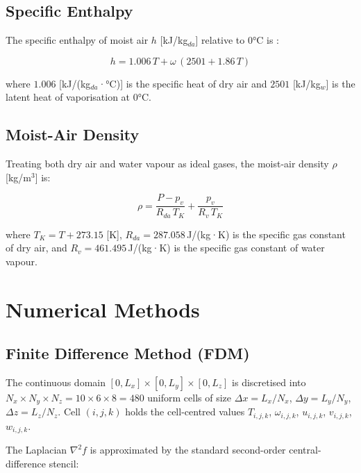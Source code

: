 \documentclass[12pt,a4paper]{report}
\begin{document}
\subsection{Specific Enthalpy}
\label{subsec:enthalpy}

The specific enthalpy of moist air $h$ [kJ/kg$_{da}$] relative to 0°C is \cite{ashrae2021}:

\begin{equation}
  \boxed{h = 1.006\,T + \omega\,(2501 + 1.86\,T)}
  \label{eq:enthalpy}
\end{equation}

where $1.006$ [kJ/(kg$_{da}$·°C)] is the specific heat of dry air and $2501$ [kJ/kg$_w$] is the latent heat of vaporisation at 0°C.

\subsection{Moist-Air Density}
\label{subsec:density}

Treating both dry air and water vapour as ideal gases, the moist-air density $\rho$ [kg/m$^3$] is:

\begin{equation}
  \boxed{\rho = \frac{P - p_v}{R_{da}\,T_K} + \frac{p_v}{R_v\,T_K}}
  \label{eq:density}
\end{equation}

where $T_K = T + 273.15$ [K], $R_{da} = 287.058$\,J/(kg·K) is the specific gas constant of dry air, and $R_v = 461.495$\,J/(kg·K) is the specific gas constant of water vapour.

\section{Numerical Methods}
\label{sec:numerics}

\subsection{Finite Difference Method (FDM)}
\label{subsec:fdm}

The continuous domain $[0,L_x]\times[0,L_y]\times[0,L_z]$ is discretised into $N_x \times N_y \times N_z = 10\times6\times8 = 480$ uniform cells of size $\Delta x = L_x/N_x$, $\Delta y = L_y/N_y$, $\Delta z = L_z/N_z$. Cell $(i,j,k)$ holds the cell-centred values $T_{i,j,k}$, $\omega_{i,j,k}$, $u_{i,j,k}$, $v_{i,j,k}$, $w_{i,j,k}$.

The Laplacian $\nabla^2 f$ is approximated by the standard second-order central-difference stencil:
\end{document}

